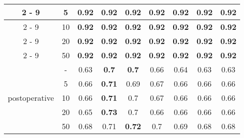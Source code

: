 \documentclass{article}%
\begin{document}
\begin{longtable}{c|c|ccccccc}
\cline{2%
-%
9}%
&5&\textbf{0.92}&\textbf{0.92}&\textbf{0.92}&\textbf{0.92}&\textbf{0.92}&\textbf{0.92}&\textbf{0.92}\\%
\cline{2%
-%
9}%
&10&\textbf{0.92}&\textbf{0.92}&\textbf{0.92}&\textbf{0.92}&\textbf{0.92}&\textbf{0.92}&\textbf{0.92}\\%
\cline{2%
-%
9}%
&20&\textbf{0.92}&\textbf{0.92}&\textbf{0.92}&\textbf{0.92}&\textbf{0.92}&\textbf{0.92}&\textbf{0.92}\\%
\cline{2%
-%
9}%
&50&\textbf{0.92}&\textbf{0.92}&\textbf{0.92}&\textbf{0.92}&\textbf{0.92}&\textbf{0.92}&\textbf{0.92}\\%
\hline%
\multirow{5}{*}{postoperative}&{-}&0.63&\textbf{0.7}&\textbf{0.7}&0.66&0.64&0.63&0.63\\%
\cline{2%
-%
9}%
&5&0.66&\textbf{0.71}&0.69&0.67&0.66&0.66&0.66\\%
\cline{2%
-%
9}%
&10&0.66&\textbf{0.71}&0.7&0.67&0.66&0.66&0.66\\%
\cline{2%
-%
9}%
&20&0.65&\textbf{0.73}&0.7&0.66&0.66&0.66&0.66\\%
\cline{2%
-%
9}%
&50&0.68&0.71&\textbf{0.72}&0.7&0.69&0.68&0.68\\%
\hline%
\end{longtable}

%
\end{document}
